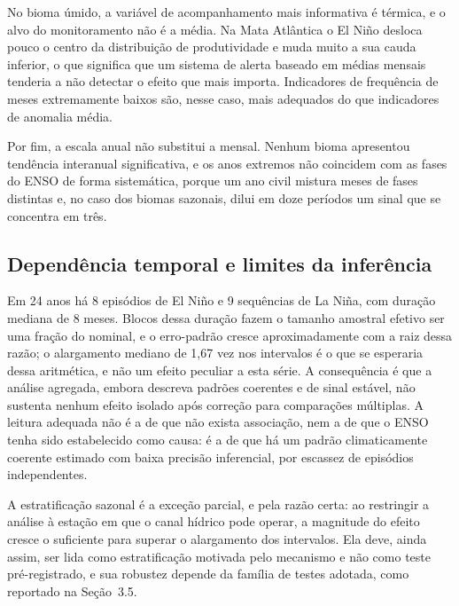 \documentclass[a4paper,fleqn]{cas-sc}
\begin{document}
No bioma úmido, a variável de acompanhamento mais informativa é térmica, e o alvo do monitoramento não é a média. Na Mata Atlântica o El Niño desloca pouco o centro da distribuição de produtividade e muda muito a sua cauda inferior, o que significa que um sistema de alerta baseado em médias mensais tenderia a não detectar o efeito que mais importa. Indicadores de frequência de meses extremamente baixos são, nesse caso, mais adequados do que indicadores de anomalia média.

Por fim, a escala anual não substitui a mensal. Nenhum bioma apresentou tendência interanual significativa, e os anos extremos não coincidem com as fases do ENSO de forma sistemática, porque um ano civil mistura meses de fases distintas e, no caso dos biomas sazonais, dilui em doze períodos um sinal que se concentra em três.

\subsection{Dependência temporal e limites da inferência}

Em 24 anos há 8 episódios de El Niño e 9 sequências de La Niña, com duração mediana de 8 meses. Blocos dessa duração fazem o tamanho amostral efetivo ser uma fração do nominal, e o erro-padrão cresce aproximadamente com a raiz dessa razão; o alargamento mediano de 1,67 vez nos intervalos é o que se esperaria dessa aritmética, e não um efeito peculiar a esta série. A consequência é que a análise agregada, embora descreva padrões coerentes e de sinal estável, não sustenta nenhum efeito isolado após correção para comparações múltiplas. A leitura adequada não é a de que não exista associação, nem a de que o ENSO tenha sido estabelecido como causa: é a de que há um padrão climaticamente coerente estimado com baixa precisão inferencial, por escassez de episódios independentes.

A estratificação sazonal é a exceção parcial, e pela razão certa: ao restringir a análise à estação em que o canal hídrico pode operar, a magnitude do efeito cresce o suficiente para superar o alargamento dos intervalos. Ela deve, ainda assim, ser lida como estratificação motivada pelo mecanismo e não como teste pré-registrado, e sua robustez depende da família de testes adotada, como reportado na Seção~3.5.
\end{document}
